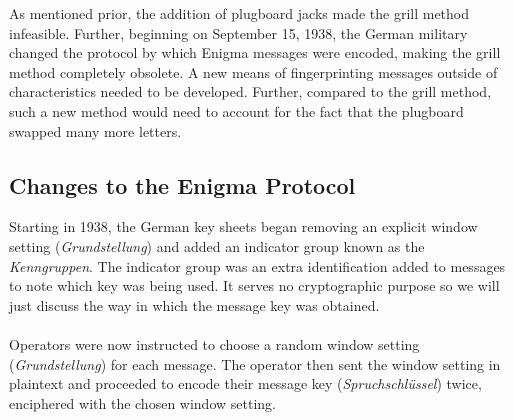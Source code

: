 As mentioned prior, the addition of plugboard jacks made the grill
method infeasible.
Further, beginning on September 15, 1938, the German military changed
the protocol by which Enigma messages were encoded, making the grill
method completely obsolete. A new means of fingerprinting messages
outside of characteristics needed to be developed. Further, compared
to the grill method, such a new method would need to account for the
fact that the plugboard swapped many more letters.

\subsection{Changes to the Enigma Protocol}

Starting in 1938, the German key sheets began removing an explicit
window setting (\emph{Grundstellung}) and added an indicator group
known as the \emph{Kenngruppen}. The indicator group was an extra
identification added to messages to note which key was being used. It
serves no cryptographic purpose so we will just discuss the way in
which the message key was obtained.
\\\\Operators were now instructed to choose a random window setting
(\emph{Grundstellung}) for each message. The operator then sent the
window setting in plaintext and proceeded to encode their message key
(\emph{Spruchschlüssel}) twice, enciphered with the chosen window
setting. %
